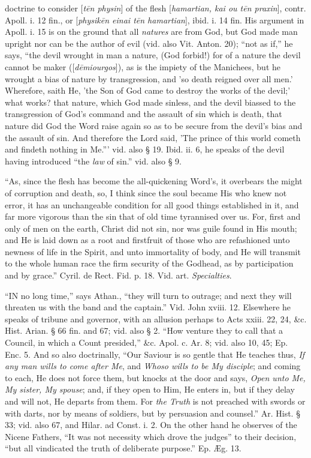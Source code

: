 doctrine to consider [\emph{t\={e}n
physin}] of the flesh [\emph{hamartian,
kai ou t\={e}n praxin}],
contr. Apoll. i. 12 fin., or [\emph{physik\={e}n
einai t\={e}n hamartian}],
ibid. i. 14 fin. His argument in Apoll. i. 15 is on the ground
that all \emph{natures} are from
God, but God made man upright nor can be the author of evil (vid. also
Vit. Anton. 20); ``not as if,'' he says, ``the devil wrought in man a
nature, (God forbid!) for of a nature the devil cannot be maker ([\emph{d\={e}miourgos}]), as is the impiety of the Manichees, but he wrought a bias of
nature by transgression, and 'so death reigned over all men.'
Wherefore, saith He, 'the Son of God came to destroy the works
of the devil;' what works? that nature, which God made sinless, and
the devil biassed to the transgression of God's command and the
assault of sin which is death, that nature did God the Word raise
again so as to be secure from the devil's bias and the assault of sin.
And therefore the Lord said, 'The prince of this world cometh and
findeth nothing in Me.''' vid. also § 19. Ibid. ii. 6, he speaks of
the devil having introduced ``the \emph{law}
of sin.'' vid. also § 9.

``As, since the flesh has become the
all-quickening Word's, it overbears the might of corruption and death,
so, I think since the soul became His who knew not error, it has an
unchangeable condition for all good things established in it, and far
more vigorous than the sin that of old time tyrannised over us. For,
first and only of men on the earth, Christ did not sin, nor was guile
found in His mouth; and He is laid down as a root and firstfruit of
those who are refashioned unto newness of life in the Spirit, and unto
immortality of body, and He will transmit to the whole human race the
firm security of the Godhead, as by participation and by grace.''
Cyril. de Rect. Fid. p. 18.
Vid. art. \emph{Specialties}.


``IN
no long time,'' says Athan., ``they will turn to outrage; and next they
will threaten us with the band and the captain.'' Vid. John xviii. 12.
Elsewhere he speaks of tribune and governor, with an allusion perhaps
to Acts xxiii. 22, 24, \&c. Hist. Arian. § 66 fin. and 67; vid.
also § 2. ``How venture they to call that a Council, in which a Count
presided,'' \&c. Apol. c. Ar. 8; vid. also 10, 45; Ep. Enc. 5. And
so also doctrinally, ``Our Saviour is so gentle that He teaches thus, \emph{If
any man wills to come after Me}, and \emph{Whoso
wills to be My disciple}; and coming to each, He does not force
them, but knocks at the door and says, \emph{Open
unto Me, My sister, My spouse}; and, if they open to Him, He enters
in, but if they delay and will not, He departs from them. For \emph{the
Truth} is not preached with swords or with darts, nor by means of
soldiers, but by persuasion and counsel.'' Ar. Hist. § 33; vid. also
67, and Hilar. ad Const. i. 2. On the other hand he observes of the
Nicene Fathers, ``It was not necessity which drove the judges'' to their
decision, ``but all vindicated the truth of deliberate purpose.'' Ep. Æg.
13.

